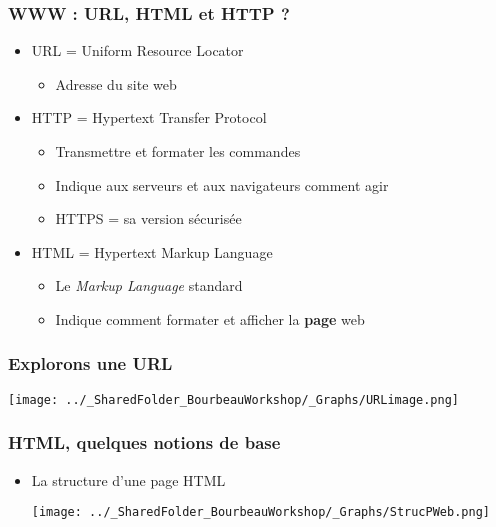 \documentclass{beamer}
\begin{document}
      \begin{frame}
        \frametitle{WWW : URL, HTML et HTTP ?}
        \begin{itemize}
          \item<2-> URL  = Uniform Resource Locator
            \begin{itemize}
              \item Adresse du site web
            \end{itemize}
          \item<3-> HTTP = Hypertext Transfer Protocol
            \begin{itemize}
              \item Transmettre et formater les commandes
              \item Indique aux serveurs et aux navigateurs comment agir
              \item HTTPS = sa version sécurisée
            \end{itemize}
          \item<4-> HTML = Hypertext Markup Language
            \begin{itemize}
              \item Le \textit{Markup Language} standard
              \item Indique comment formater et afficher la \textbf{page} web
            \end{itemize}
        \end{itemize}
      \end{frame}
      
      \begin{frame}
        \frametitle{Explorons une URL} \vspace{1cm}
          \begin{center}
            \texttt{[image: ../\_SharedFolder\_BourbeauWorkshop/\_Graphs/URLimage.png]}
          \end{center}
      \end{frame}
      
      \begin{frame}
        \frametitle{HTML, quelques notions de base} \vspace{0.3cm}
        \begin{itemize}
          \item<2-> La structure d'une page HTML 
            \begin{center}
            \texttt{[image: ../\_SharedFolder\_BourbeauWorkshop/\_Graphs/StrucPWeb.png]}
            \end{center}
        \end{itemize}
      \end{frame}
      
\end{document}
